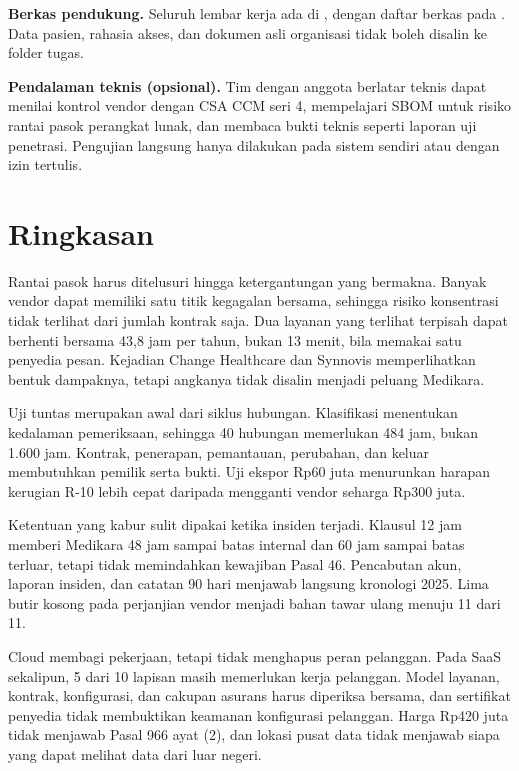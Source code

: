 \textbf{Berkas pendukung.} Seluruh lembar kerja ada di , dengan daftar
berkas pada . Data pasien, rahasia akses, dan dokumen asli
organisasi tidak boleh disalin ke folder tugas.

\textbf{Pendalaman teknis (opsional).} Tim dengan anggota berlatar teknis dapat menilai kontrol
vendor dengan CSA CCM seri 4, mempelajari SBOM untuk risiko rantai pasok perangkat lunak, dan
membaca bukti teknis seperti laporan uji penetrasi. Pengujian langsung hanya dilakukan pada sistem
sendiri atau dengan izin tertulis.

\section{Ringkasan}

Rantai pasok harus ditelusuri hingga ketergantungan yang bermakna. Banyak vendor dapat memiliki satu
titik kegagalan bersama, sehingga risiko konsentrasi tidak terlihat dari jumlah kontrak saja. Dua
layanan yang terlihat terpisah dapat berhenti bersama 43,8 jam per tahun, bukan 13 menit, bila
memakai satu penyedia pesan. Kejadian Change Healthcare dan Synnovis memperlihatkan bentuk
dampaknya, tetapi angkanya tidak disalin menjadi peluang Medikara.

Uji tuntas merupakan awal dari siklus hubungan. Klasifikasi menentukan kedalaman pemeriksaan,
sehingga 40 hubungan memerlukan 484 jam, bukan 1.600 jam. Kontrak, penerapan, pemantauan, perubahan,
dan keluar membutuhkan pemilik serta bukti. Uji ekspor Rp60 juta menurunkan harapan kerugian R-10
lebih cepat daripada mengganti vendor seharga Rp300 juta.

Ketentuan yang kabur sulit dipakai ketika insiden terjadi. Klausul 12 jam memberi Medikara 48 jam
sampai batas internal dan 60 jam sampai batas terluar, tetapi tidak memindahkan kewajiban Pasal 46.
Pencabutan akun, laporan insiden, dan catatan 90 hari menjawab langsung kronologi 2025. Lima butir
kosong pada perjanjian vendor menjadi bahan tawar ulang menuju 11 dari 11.

Cloud membagi pekerjaan, tetapi tidak menghapus peran pelanggan. Pada SaaS sekalipun, 5 dari 10
lapisan masih memerlukan kerja pelanggan. Model layanan, kontrak, konfigurasi, dan cakupan asurans
harus diperiksa bersama, dan sertifikat penyedia tidak membuktikan keamanan konfigurasi pelanggan.
Harga Rp420 juta tidak menjawab Pasal 966 ayat (2), dan lokasi pusat data tidak menjawab siapa yang
dapat melihat data dari luar negeri.

